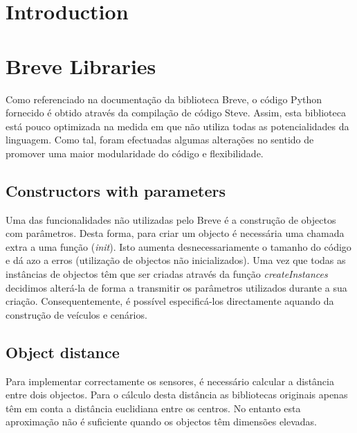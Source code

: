 \documentclass[a4paper]{article}
\title{\documentTitle}
\author{\documentAuthors{}}
\begin{document}
\renewcommand{\figurename}{Figure}
\maketitle
\cleardoublepage

\tableofcontents
\cleardoublepage

\setlength{\parindent}{1cm}
\setlength{\parskip}{0.3cm}

\section{Introduction}

\cleardoublepage
\section{Breve Libraries}
\indent \indent Como referenciado na documentação da biblioteca Breve, o código Python fornecido é obtido através da compilação de código Steve.
Assim, esta biblioteca está pouco optimizada na medida em que não utiliza todas as potencialidades da linguagem.
Como tal, foram efectuadas algumas alterações no sentido de promover uma maior modularidade do código e flexibilidade.

\subsection{Constructors with parameters}
\indent \indent Uma das funcionalidades não utilizadas pelo Breve é a construção de objectos com parâmetros.
Desta forma, para criar um objecto é necessária uma chamada extra a uma função (\emph{init}).
Isto aumenta desnecessariamente o tamanho do código e dá azo a erros (utilização de objectos não inicializados).
Uma vez que todas as instâncias de objectos têm que ser criadas através da função \emph{createInstances} decidimos alterá-la de forma a transmitir os parâmetros utilizados durante a sua criação.
Consequentemente, é possível especificá-los directamente aquando da construção de veículos e cenários.

\subsection{Object distance}
\indent \indent Para implementar correctamente os sensores, é necessário calcular a distância entre dois objectos.
Para o cálculo desta distância as bibliotecas originais apenas têm em conta a distância euclidiana entre os centros.
No entanto esta aproximação não é suficiente quando os objectos têm dimensões elevadas.
\end{document}
